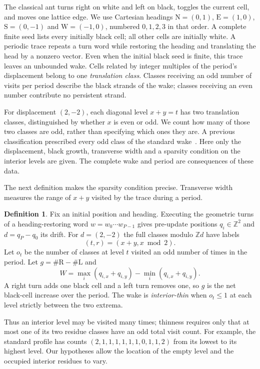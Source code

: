 \documentclass[11pt]{article}
\theoremstyle{definition}\newtheorem{definition}[theorem]{Definition}
\newcommand{\Z}{\mathbb Z}
\newcommand{\Rr}{\mathrm R}
\newcommand{\Ll}{\mathrm L}
\begin{document}
The classical ant turns right on white and left on black, toggles the current
cell, and moves one lattice edge. We use Cartesian headings
$\mathrm N=(0,1)$, $\mathrm E=(1,0)$, $\mathrm S=(0,-1)$ and
$\mathrm W=(-1,0)$, numbered $0,1,2,3$ in that order. A complete finite seed lists every initially black cell;
all other cells are initially white. A periodic trace repeats a turn word while
restoring the heading and translating the head by a nonzero vector. Even when
the initial black seed is finite, this trace leaves an unbounded wake. Cells
related by integer multiples of the period's displacement belong to one
\emph{translation class}. Classes receiving an odd number of visits per
period describe the black strands of the wake; classes receiving an even
number contribute no persistent strand.

For displacement $(2,-2)$, each diagonal level $x+y=t$ has two translation
classes, distinguished by whether $x$ is even or odd. We count how many of
those two classes are odd, rather than specifying which ones they are. A
previous classification prescribed every odd class of the standard
wake~\cite{KeStandard}. Here only the displacement, black growth, transverse
width and a sparsity condition on the interior levels are given. The complete
wake and period are consequences of these data.

The next definition makes the sparsity condition precise. Transverse width
measures the range of $x+y$ visited by the trace during a period.

\begin{definition}
Fix an initial position and heading. Executing the geometric turns of
a heading-restoring word $w=w_0\cdots w_{P-1}$ gives pre-update positions
$q_i\in\Z^2$ and $d=q_P-q_0$ its drift. For $d=(2,-2)$ the full classes
modulo $\Z d$ have labels
\[
(t,r)=(x+y,x\bmod2).
\]
Let $o_t$ be the number of classes at level $t$ visited an odd number of times
in the period. Let $g=\#\Rr-\#\Ll$ and
\[
W=\max_i(q_{i,x}+q_{i,y})-\min_i(q_{i,x}+q_{i,y}).
\]
A right turn adds one black cell and a left turn removes one, so $g$ is
the net black-cell increase over the period. The wake is \emph{interior-thin} when $o_t\le1$ at each level strictly between
the two extrema.
\end{definition}

Thus an interior level may be visited many times; thinness requires only
that at most one of its two residue classes have an odd total visit count.
For example, the standard profile has counts
$(2,1,1,1,1,1,1,0,1,1,2)$ from its lowest to its highest level. Our hypotheses
allow the location of the empty level and the occupied interior residues to
vary.
\end{document}
